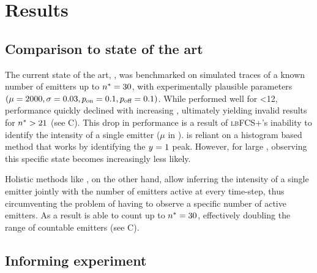 \section{Results}

\subsection{Comparison to state of the art \lbfcs}

%

The current state of the art, \lbfcs, was benchmarked on simulated traces of a known number of emitters up to $n^* = 30$, with experimentally plausible parameters $(\mu=2000, \sigma=0.03, p_\text{on}=0.1, p_\text{off}=0.1)$.
While \lbfcs performed well for \truen \textless 12, performance quickly declined with increasing \truen, ultimately yielding invalid results for $n^* > 21$ (see C).
This drop in performance is a result of \textsc{lbFCS+}’s inability to identify the intensity of a single emitter ($\mu$ in \ours). \lbfcs is reliant on a histogram based method that works by identifying the $y_{}=1$ peak. However, for large \truen, observing this specific state becomes increasingly less likely. 

Holistic methods like \ours, on the other hand, allow inferring the intensity of a single emitter
jointly with the number of emitters active at every time-step, thus
circumventing the problem of having to observe a specific number of active emitters.
As a result \ours is able to count up to $n^* = 30$, effectively doubling the range of countable emitters (see  C).



\subsection{Informing experiment}

